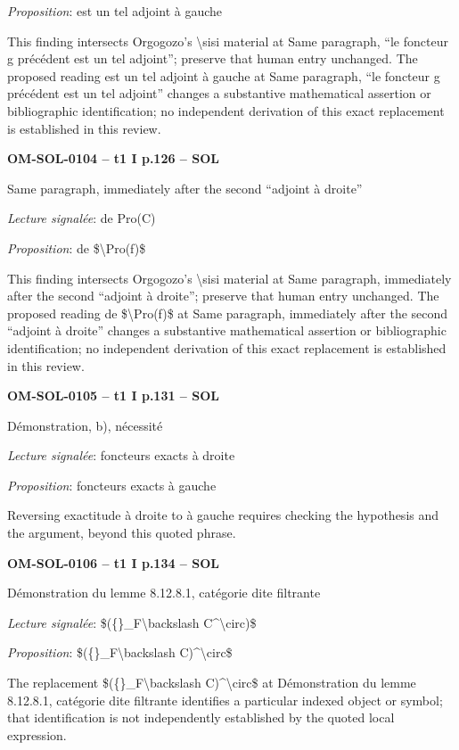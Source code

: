 \emph{Proposition}: est un tel adjoint à gauche\par
This finding intersects Orgogozo's \textbackslash{}sisi material at Same paragraph, “le foncteur g précédent est un tel adjoint”; preserve that human entry unchanged. The proposed reading est un tel adjoint à gauche at Same paragraph, “le foncteur g précédent est un tel adjoint” changes a substantive mathematical assertion or bibliographic identification; no independent derivation of this exact replacement is established in this review.\par
\par\noindent\textbf{OM-SOL-0104 -- t1 I p.126 -- SOL}\par
Same paragraph, immediately after the second “adjoint à droite”\par
\emph{Lecture signalée}: de Pro(C)\par
\emph{Proposition}: de \$\textbackslash{}Pro(f)\$\par
This finding intersects Orgogozo's \textbackslash{}sisi material at Same paragraph, immediately after the second “adjoint à droite”; preserve that human entry unchanged. The proposed reading de \$\textbackslash{}Pro(f)\$ at Same paragraph, immediately after the second “adjoint à droite” changes a substantive mathematical assertion or bibliographic identification; no independent derivation of this exact replacement is established in this review.\par
\par\noindent\textbf{OM-SOL-0105 -- t1 I p.131 -- SOL}\par
Démonstration, b), nécessité\par
\emph{Lecture signalée}: foncteurs exacts à droite\par
\emph{Proposition}: foncteurs exacts à gauche\par
Reversing exactitude à droite to à gauche requires checking the hypothesis and the argument, beyond this quoted phrase.\par
\par\noindent\textbf{OM-SOL-0106 -- t1 I p.134 -- SOL}\par
Démonstration du lemme 8.12.8.1, catégorie dite filtrante\par
\emph{Lecture signalée}: \$(\{\}\_F\textbackslash{}backslash C\textasciicircum{}\textbackslash{}circ)\$\par
\emph{Proposition}: \$(\{\}\_F\textbackslash{}backslash C)\textasciicircum{}\textbackslash{}circ\$\par
The replacement \$(\{\}\_F\textbackslash{}backslash C)\textasciicircum{}\textbackslash{}circ\$ at Démonstration du lemme 8.12.8.1, catégorie dite filtrante identifies a particular indexed object or symbol; that identification is not independently established by the quoted local expression.\par
